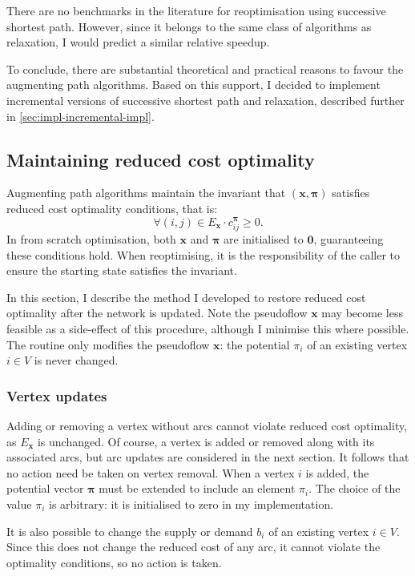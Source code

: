 There are no benchmarks in the literature for reoptimisation using successive shortest path. However, since it belongs to the same class of algorithms as relaxation, I would predict a similar relative speedup. 

To conclude, there are substantial theoretical and practical reasons to favour the augmenting path algorithms. Based on this support, I decided to implement incremental versions of successive shortest path and relaxation, described further in \cref{sec:impl-incremental-impl}.

\subsection{Maintaining reduced cost optimality} \label{sec:impl-incremental-maintaining-rc}

Augmenting path algorithms maintain the invariant that $\left(\mathbf{x},\boldsymbol{\pi}\right)$ satisfies reduced cost optimality conditions, that is:
\[\forall(i,j)\in E_{\mathbf{x}}\cdot c_{ij}^{\boldsymbol{\pi}}\geq 0.\]
In from scratch optimisation, both $\mathbf{x}$ and $\boldsymbol{\pi}$ are initialised to $\mathbf{0}$, guaranteeing these conditions hold. When reoptimising, it is the responsibility of the caller to ensure the starting state satisfies the invariant.

In this section, I describe the method I developed to restore reduced cost optimality after the network is updated. Note the pseudoflow $\mathbf{x}$ may become less feasible as a side-effect of this procedure, although I minimise this where possible. The routine only modifies the pseudoflow $\mathbf{x}$: the potential $\pi_i$ of an existing vertex $i \in V$ is never changed.

\subsubsection{Vertex updates}

Adding or removing a vertex without arcs cannot violate reduced cost optimality, as $E_\mathbf{x}$ is unchanged. Of course, a vertex is added or removed along with its associated arcs, but arc updates are considered in the next section. It follows that no action need be taken on vertex removal. When a vertex $i$ is added, the potential vector $\boldsymbol{\pi}$ must be extended to include an element $\pi_i$. The choice of the value $\pi_i$ is arbitrary: it is initialised to zero in my implementation.

It is also possible to change the supply or demand $b_i$ of an existing vertex $i \in V$. Since this does not change the reduced cost of any arc, it cannot violate the optimality conditions, so no action is taken.


